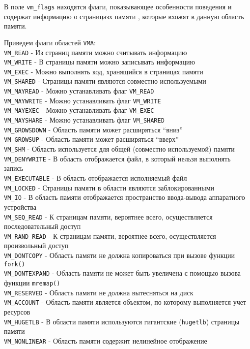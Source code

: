 \documentclass[12pt]{article}
\begin{document}
В поле \verb!vm_flags! находятся флаги, показывающее особенности поведения и содержат информацию о страницазх памяти
, которые вхожят в данную область памяти.

Приведем флаги областей \verb!VMA!: ~\\
\verb!VM_READ! - Из страниц памяти можно считывать информацию\\
\verb!VM_WRITE! - В страницы памяти можно записывать информацию\\
\verb!VM_EXEC! - Можно выполнять код, хранящийся в страницах памяти\\
\verb!VM_SHARED! - Страницы памяти являются совместно используемыми\\
\verb!VM_MAYREAD! - Можно устанавливать флаг \verb!VM_READ!\\ 
\verb!VM_MAYWRITE! - Можно устанавливать флаг \verb!VM_WRITE!\\ 
\verb!VM_MAYEXEC! - Можно устанавливать флаг \verb!VM_EXEC!\\ 
\verb!VM_MAYSHARE! - Можно устанавливать флаг \verb!VM_SHARED!\\ 
\verb!VM_GROWSDOWN! - Область памяти может расширяться “вниз”\\ 
\verb!VM_GROWSUP! - Область памяти может расширяться “вверх”\\ 
\verb!VM_SHM! - Область используется для общей (совместно используемой) памяти\\ 
\verb!VM_DENYWRITE! - В область отображается файл, в который нельзя выполнять запись\\ 
\verb!VM_EXECUTABLE! - В область отображается исполняемый файл\\ 
\verb!VM_LOCKED! - Страницы памяти в области являются заблокированными\\ 
\verb!VM_IO! - В область памяти отображается пространство ввода-вывода аппаратного устройства\\ 
\verb!VM_SEQ_READ! - К страницам памяти, вероятнее всего, осуществляется последовательный доступ\\ 
\verb!VM_RAND_READ! - К страницам памяти, вероятнее всего, осуществляется произвольный доступ\\ 
\verb!VM_DONTCOPY! - Область памяти не должна копироваться при вызове функции \verb!fork()!\\ 
\verb!VM_DONTEXPAND! - Область памяти не может быть увеличена с помощью вызова функции \verb!mremap()!\\  
\verb!VM_RESERVED! - Область памяти не должна вытесняться на диск\\
\verb!VM_ACCOUNT! - Область памяти является объектом, по которому выполняется учет ресурсов\\
\verb!VM_HUGETLB! - В области памяти используются гигантские (\verb!hugetlb!) страницы памяти\\
\verb!VM_NONLINEAR! - Область памяти содержит нелинейное отображение\\
\end{document}
